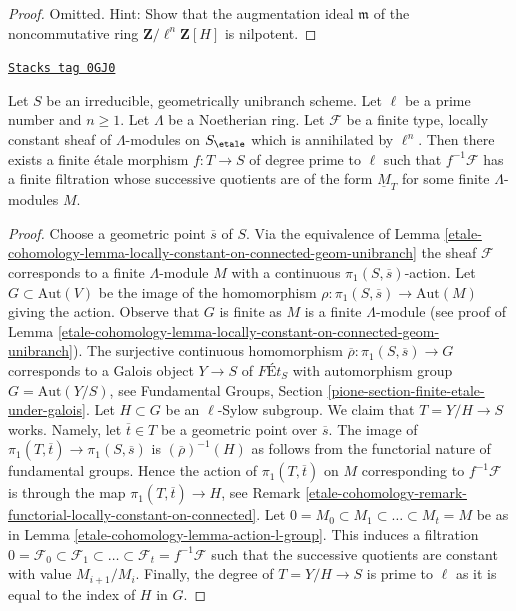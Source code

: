 \begin{proof}
Omitted. Hint: Show that the augmentation ideal $\mathfrak m$
of the noncommutative ring $\mathbf{Z}/\ell^n\mathbf{Z}[H]$
is nilpotent.
\end{proof}

\begin{lemma}
\label{etale-cohomology-lemma-pullback-filtered-modules}
\href{https://stacks.math.columbia.edu/tag/0GJ0}{\texttt{Stacks tag 0GJ0}}

Let $S$ be an irreducible, geometrically unibranch scheme.
Let $\ell$ be a prime number and $n \geq 1$. Let $\Lambda$
be a Noetherian ring. Let $\mathcal{F}$ be a finite type,
locally constant sheaf of $\Lambda$-modules on $S_\etale$
which is annihilated by $\ell^n$. Then there exists a
finite \'etale morphism $f : T \to S$ of degree prime to $\ell$
such that $f^{-1}\mathcal{F}$ has a finite filtration whose
successive quotients are of the form $\underline{M}_T$
for some finite $\Lambda$-modules $M$.
\end{lemma}

\begin{proof}
Choose a geometric point $\overline{s}$ of $S$.
Via the equivalence of
Lemma \ref{etale-cohomology-lemma-locally-constant-on-connected-geom-unibranch}
the sheaf $\mathcal{F}$ corresponds to a finite $\Lambda$-module
$M$ with a continuous $\pi_1(S, \overline{s})$-action.
Let $G \subset \text{Aut}(V)$ be the image of the homomorphism
$\rho : \pi_1(S, \overline{s}) \to \text{Aut}(M)$ giving the action.
Observe that $G$ is finite as $M$ is a finite $\Lambda$-module
(see proof of Lemma \ref{etale-cohomology-lemma-locally-constant-on-connected-geom-unibranch}).
The surjective continuous homomorphism
$\overline{\rho} : \pi_1(S, \overline{s}) \to G$
corresponds to a Galois object $Y \to S$ of
$\textit{F\'Et}_S$ with automorphism group $G = \text{Aut}(Y/S)$, see
Fundamental Groups, Section \ref{pione-section-finite-etale-under-galois}.
Let $H \subset G$ be an $\ell$-Sylow subgroup.
We claim that $T = Y/H \to S$ works. Namely, let $\overline{t} \in T$
be a geometric point over $\overline{s}$. The image of
$\pi_1(T, \overline{t}) \to \pi_1(S, \overline{s})$
is $(\overline{\rho})^{-1}(H)$ as follows from the functorial
nature of fundamental groups. Hence the action of $\pi_1(T, \overline{t})$
on $M$ corresponding to $f^{-1}\mathcal{F}$ is through
the map $\pi_1(T, \overline{t}) \to H$, see
Remark \ref{etale-cohomology-remark-functorial-locally-constant-on-connected}.
Let $0 = M_0 \subset M_1 \subset \ldots \subset M_t = M$
be as in Lemma \ref{etale-cohomology-lemma-action-l-group}.
This induces a filtration
$0 = \mathcal{F}_0 \subset \mathcal{F}_1 \subset \ldots
\subset \mathcal{F}_t = f^{-1}\mathcal{F}$
such that the successive quotients are constant with
value $M_{i + 1}/M_i$.
Finally, the degree of $T = Y/H \to S$ is prime to $\ell$
as it is equal to the index of $H$ in $G$.
\end{proof}

